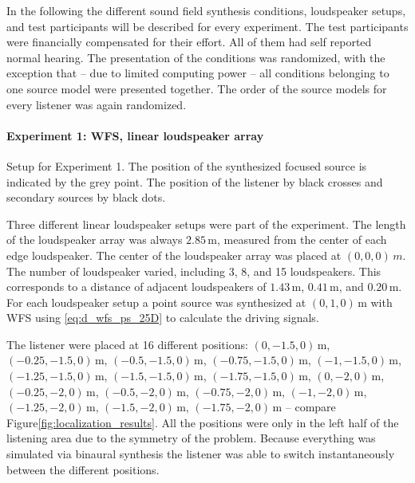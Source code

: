 In the
following the different sound field synthesis conditions, loudspeaker setups, and
test participants will be described for every experiment.
The test participants were financially compensated for their effort. All of them
had self reported normal hearing.
The presentation of the conditions was randomized, with the exception that -- due to
limited computing power -- all conditions belonging to one source model were
presented together. The order of the source models for every listener was again
randomized.


\paragraph{Experiment 1: \ac{WFS}, linear loudspeaker array}
\label{sec:experiment1_wfs_linear_array}
%
\begin{marginfigure}
    \ft
    
    \caption{Setup for Experiment 1. The position of the synthesized focused
    source is indicated by the grey point. The position of the listener by black
    crosses and secondary sources by black dots.
        }
    \label{fig:setup_wfs_linear_array}
\end{marginfigure}
%
Three different linear loudspeaker setups were part of the experiment. The
length of the loudspeaker array was always $2.85$\,m, measured from the center
of each edge loudspeaker. The center of the loudspeaker array was placed at
$(0,0,0)\,m$. The number of loudspeaker varied,
including 3, 8, and 15 loudspeakers. This corresponds to a distance of
adjacent loudspeakers of $1.43$\,m, $0.41$\,m, and $0.20$\,m. For each loudspeaker
setup a point source was synthesized at $(0,1,0)$\,m with \ac{WFS}
using \eqref{eq:d_wfs_ps_25D} to calculate the driving signals.

The listener were placed at 16 different positions: $(0,-1.5,0)$\,m,
$(-0.25,-1.5,0)$\,m, $(-0.5,-1.5,0)$\,m, $(-0.75,-1.5,0)$\,m, $(-1,-1.5,0)$\,m,
$(-1.25,-1.5,0)$\,m, $(-1.5,-1.5,0)$\,m, $(-1.75,-1.5,0)$\,m, $(0,-2,0)$\,m,
$(-0.25,-2,0)$\,m, $(-0.5,-2,0)$\,m, $(-0.75,-2,0)$\,m, $(-1,-2,0)$\,m,
$(-1.25,-2,0)$\,m, $(-1.5,-2,0)$\,m, $(-1.75,-2,0)$\,m  -- compare
Figure\ref{fig:localization_results}.
All the positions were only in the left half of the listening area due to the
symmetry of the problem.
Because everything was simulated via
binaural synthesis the listener was able to switch instantaneously between the
different positions.

